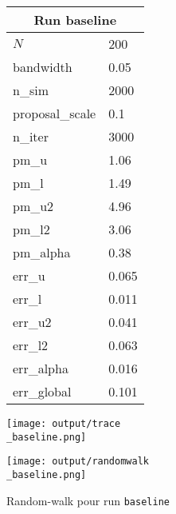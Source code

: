 
\begin{figure}[H]
  \centering
  \begin{minipage}[t]{0.45\textwidth}
    \vspace{0pt}
    \footnotesize
    \begin{tabular}{|l|l|}\hline
    \multicolumn{2}{|c|}{\textbf{Run baseline}} \\ \hline
    $N$ & 200 \\ \hline
    bandwidth & 0.05 \\ \hline
    n\_sim & 2000 \\ \hline
    proposal\_scale & 0.1 \\ \hline
    n\_iter & 3000 \\ \hline
    pm\_u & 1.06 \\ \hline
    pm\_l & 1.49 \\ \hline
    pm\_u2 & 4.96 \\ \hline
    pm\_l2 & 3.06 \\ \hline
    pm\_alpha & 0.38 \\ \hline
    err\_u & 0.065 \\ \hline
    err\_l & 0.011 \\ \hline
    err\_u2 & 0.041 \\ \hline
    err\_l2 & 0.063 \\ \hline
    err\_alpha & 0.016 \\ \hline
    err\_global & 0.101 \\ \hline
    \end{tabular}
  \end{minipage}
  \hfill
  \begin{minipage}[t]{0.45\textwidth}
    \vspace{0pt}
    \texttt{[image: output/trace\\\_baseline.png]}
  \end{minipage}
\end{figure}

\begin{figure}[H]
  \centering
  \texttt{[image: output/randomwalk\\\_baseline.png]}
  \caption{Random-walk pour run \texttt{baseline}}
\end{figure}

